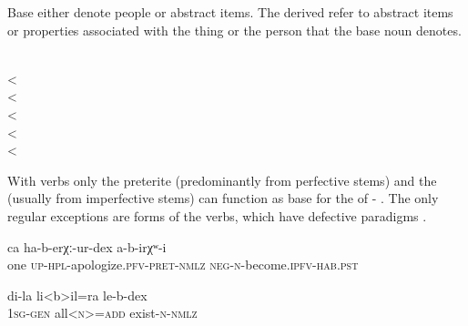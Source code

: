 Base  either denote people or abstract items. The derived  refer to abstract items or properties associated with the thing or the person that the base noun denotes.
%
\begin{exe}
	\ex	\label{ʡaˁχːuˁl-dexhospitality}
	\begin{xlist}
		\TabPositions{2em,4em}
		\ex	{}  \\
\tab	<	\tab	{} 
		\ex	{} 		\\
		\tab	<	\tab	{} 
		\ex	{} \\
		\tab					<	\tab	{} 
		\ex	{}  \\
		\tab					<	\tab	{} 
		\ex	{} 			\\
			<	\tab	{} 
	\end{xlist}
\end{exe}

With verbs only the preterite (predominantly from perfective stems) and the   (usually from imperfective stems) can function as base for the  of - . The only regular exceptions are forms of the  verbs, which have defective paradigms .
%
\begin{exe}
	\ex	\label{They did not forgive (each other)}
	\gll	ca	ha-b-erχː-ur-dex	a-b-irχʷ-i\\
		one	\textsc{up-hpl}-apologize.\textsc{pfv}-\textsc{pret}-\textsc{nmlz}	\textsc{neg}-\textsc{n}-become.\textsc{ipfv}-\textsc{hab}.\textsc{pst}\\
	\glt	{}

	\ex	\label{all my existing (things)}
	\gll	di-la	li<b>il=ra	le-b-dex\\
		1\textsc{sg}-\textsc{gen}	all<\textsc{n}>=\textsc{add}	exist-\textsc{n}-\textsc{nmlz}\\
	\glt	{}
\end{exe}

